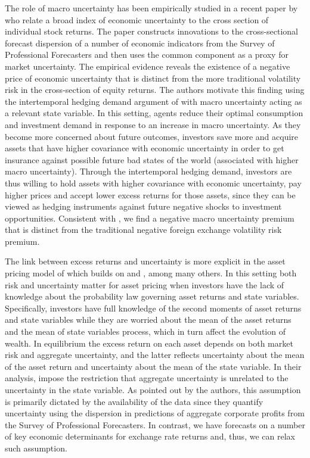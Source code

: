 The role of macro uncertainty has been empirically studied in a recent paper by \citet{Bali:2015} who relate a broad index of economic uncertainty to the cross section of individual stock returns. The paper constructs innovations to the cross-sectional forecast dispersion of a number of economic indicators from the Survey of Professional Forecasters and then uses the common component as a proxy for market uncertainty. The empirical evidence reveals the existence of a negative price of economic uncertainty that is distinct from the more traditional volatility risk in the cross-section of equity returns. The authors motivate this finding using the intertemporal hedging demand argument of \citet{merton1973} with macro uncertainty acting as a relevant state variable. In this setting, agents reduce their optimal consumption and investment demand in response to an increase in macro uncertainty. As they become more concerned about future outcomes, investors save more and acquire assets that have higher covariance with economic uncertainty in order to get insurance against possible future bad states of the world (associated with higher macro uncertainty). Through the intertemporal hedging demand, investors are thus willing to hold assets with higher covariance with economic uncertainty, pay higher prices and accept lower excess returns for those assets, since they can be viewed as hedging instruments against future negative shocks to investment opportunities. Consistent with \citet{Bali:2015}, we find a negative macro uncertainty premium that is distinct from the traditional negative foreign exchange volatility risk premium.%

The link between excess returns and uncertainty is more explicit in the asset pricing model of \citet{anderson_etal2009} which builds on \citet{merton1973} and \citet{Hansen_Sargent:2001}, among many others. In this setting both risk and uncertainty matter for asset pricing when investors have the lack of knowledge about the probability law governing asset returns and state variables. Specifically, investors have full knowledge of the second moments of asset returns and state variables while they are worried about the mean of the asset returns and the mean of state variables process, which in turn affect the evolution of wealth. In equilibrium the excess return on each asset depends on both market risk and aggregate uncertainty, and the latter reflects uncertainty about the mean of the asset return and uncertainty about the mean of the state variable. In their analysis, \citet{anderson_etal2009} impose the restriction that aggregate uncertainty is unrelated to the uncertainty in the state variable. As pointed out by the authors, this assumption is primarily dictated by the availability of the data since they quantify uncertainty using the dispersion in predictions of aggregate corporate profits from the Survey of Professional Forecasters. In contrast, we have forecasts on a number of key economic determinants for exchange rate returns and, thus, we can relax such assumption.

